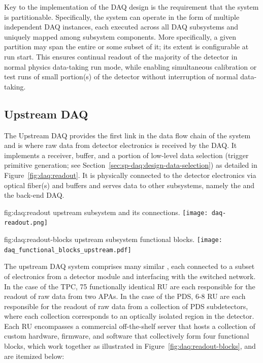 Key to the implementation of the DAQ design is the requirement that
the system is partitionable. Specifically, the system can operate in
the form of multiple independent DAQ instances, each 
executed across all DAQ subsystems and uniquely mapped among subsystem components. 
More specifically, a given partition may span the entire %
 or some subset of it; its extent is configurable at
run start. This ensures continual readout of the
majority of the detector in normal physics data-taking run mode, while
enabling simultaneous calibration or test runs of small portion(s) of the
detector without interruption of normal data-taking. 

\subsection{Upstream DAQ}
\label{sec:daq:design-upstream}

The Upstream DAQ provides the first link in the data flow chain of
the  system and is where raw data from detector electronics
is received by the DAQ.
It implements a receiver, buffer, and a portion of low-level data
selection (trigger primitive generation; see Section~\ref{sec:sp-daq:design-data-selection}) as detailed in Figure~\ref{fig:daq:readout}.
It is physically connected to the detector electronics via optical
fiber(s) and buffers and serves data to other  subsystems,
namely the  and the back-end DAQ.

\begin{dunefigure}{fig:daq:readout}{ upstream  subsystem and its connections.}
  \texttt{[image: daq-readout.png]}
\end{dunefigure}

\begin{dunefigure}{fig:daq:readout-blocks}{ upstream
     subsystem functional blocks.}
  \texttt{[image: daq\_functional\_blocks\_upstream.pdf]}
\end{dunefigure}

The upstream DAQ system comprises many similar , each
connected to a subset of electronics from a detector module and
interfacing with the  switched network. In the case of the
TPC, 75 functionally identical RU are each responsible for the readout of raw data from two
APAs. In the case of the PDS, 6-8 RU are each responsible for the
readout of raw data from a collection of PDS subdetectors, where each
collection corresponds to an optically isolated region in the
detector. 
Each RU encompasses a commercial off-the-shelf server that hosts a
collection of custom hardware, 
firmware, and software that collectively form four functional blocks,
which work together 
as illustrated in Figure~\ref{fig:daq:readout-blocks}, and are
itemized below:

